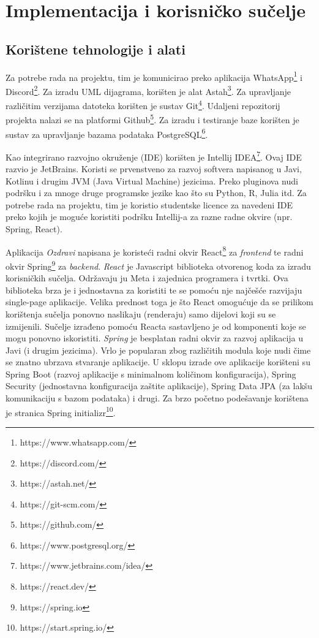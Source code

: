 \chapter{Implementacija i korisničko sučelje}
		
		
		\section{Korištene tehnologije i alati}
		
			 
			 Za potrebe rada na projektu, tim je komunicirao preko aplikacija WhatsApp\footnote{https://www.whatsapp.com/} i Discord\footnote{https://discord.com/}. 
			 Za izradu UML dijagrama, korišten je alat Astah\footnote{https://astah.net/}.
			 Za upravljanje različitim verzijama datoteka korišten je sustav Git\footnote{https://git-scm.com/}.
			 Udaljeni repozitorij projekta nalazi se na platformi Github\footnote{https://github.com/}. Za izradu i testiranje baze korišten je sustav za upravljanje bazama podataka PostgreSQL\footnote{https://www.postgresql.org/}.
			 
			 Kao integrirano razvojno okruženje (IDE) korišten je Intellij IDEA\footnote{https://www.jetbrains.com/idea/}. Ovaj IDE razvio je JetBrains. Koristi se prvenstveno za razvoj softvera napisanog u Javi, Kotlinu i drugim JVM (Java Virtual Machine) jezicima. Preko pluginova nudi podršku i za mnoge druge programske jezike kao što su Python, R, Julia itd. Za potrebe rada na projektu, tim je koristio studentske licence za navedeni IDE preko kojih je moguće koristiti podršku Intellij-a za razne radne okvire (npr. Spring, React).
			 
			 Aplikacija \textit{Ozdravi} napisana je koristeći radni okvir React\footnote{https://react.dev/} za \textit{frontend} te radni okvir Spring\footnote{https://spring.io} za \textit{backend}.
			 \textit{React} je Javascript biblioteka otvorenog koda za izradu korisničkih sučelja. Održavaju ju Meta i zajednica programera i tvrtki. Ova biblioteka brza je i jednostavna za koristiti te se pomoću nje najčešće razvijaju single-page aplikacije. Velika prednost toga je što React omogućuje da se prilikom korištenja sučelja ponovno naslikaju (renderaju) samo dijelovi koji su se izmijenili. Sučelje izrađeno pomoću Reacta sastavljeno je od komponenti koje se mogu ponovno iskoristiti.
			 \textit{Spring} je besplatan radni okvir za razvoj aplikacija u Javi (i drugim jezicima). Vrlo je popularan zbog različitih modula koje nudi čime se znatno ubrzava stvaranje aplikacije. U sklopu izrade ove aplikacije korišteni su Spring Boot (razvoj aplikacije s minimalnom količinom konfiguracija), Spring Security (jednostavna konfiguracija zaštite aplikacije), Spring Data JPA (za lakšu komunikaciju s bazom podataka) i drugi. Za brzo početno podešavanje korištena je stranica Spring initializr\footnote{https://start.spring.io/}.
				
